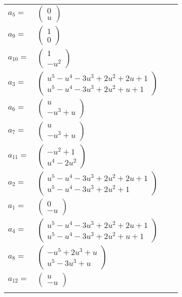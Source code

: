 \documentclass[1p]{elsarticle_modified}
\theoremstyle{definition}
\begin{document}
\begin{tabular}{m{7pt} m{180pt} m{7pt} m{180pt} }
\flushright $a_{5}=$&$\begin{pmatrix}0\\u\end{pmatrix}$ \\
\flushright $a_{9}=$&$\begin{pmatrix}1\\0\end{pmatrix}$ \\
\flushright $a_{10}=$&$\begin{pmatrix}1\\- u^2\end{pmatrix}$ \\
\flushright $a_{3}=$&$\begin{pmatrix}u^5- u^4-3 u^3+2 u^2+2 u+1\\u^5- u^4-3 u^3+2 u^2+u+1\end{pmatrix}$ \\
\flushright $a_{6}=$&$\begin{pmatrix}u\\- u^3+u\end{pmatrix}$ \\
\flushright $a_{7}=$&$\begin{pmatrix}u\\- u^3+u\end{pmatrix}$ \\
\flushright $a_{11}=$&$\begin{pmatrix}- u^2+1\\u^4-2 u^2\end{pmatrix}$ \\
\flushright $a_{2}=$&$\begin{pmatrix}u^5- u^4-3 u^3+2 u^2+2 u+1\\u^5- u^4-3 u^3+2 u^2+1\end{pmatrix}$ \\
\flushright $a_{1}=$&$\begin{pmatrix}0\\- u\end{pmatrix}$ \\
\flushright $a_{4}=$&$\begin{pmatrix}u^5- u^4-3 u^3+2 u^2+2 u+1\\u^5- u^4-3 u^3+2 u^2+u+1\end{pmatrix}$ \\
\flushright $a_{8}=$&$\begin{pmatrix}- u^5+2 u^3+u\\u^5-3 u^3+u\end{pmatrix}$ \\
\flushright $a_{12}=$&$\begin{pmatrix}u\\- u\end{pmatrix}$\\&\end{tabular}
\end{document}
